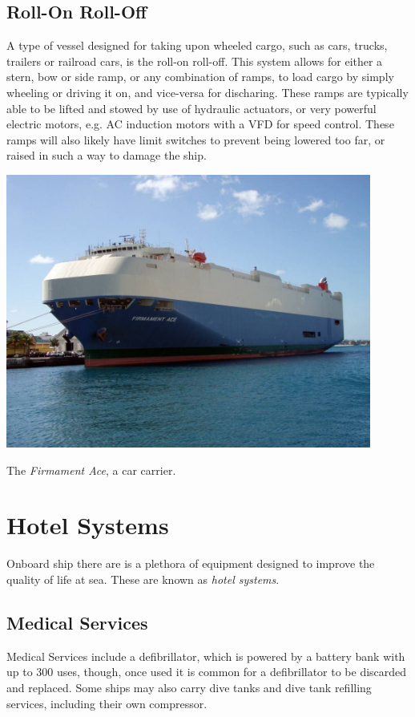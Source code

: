 \documentclass[11pt,a4paper]{article}
\begin{document}
\subsection{Roll-On Roll-Off}
A type of vessel designed for taking upon wheeled cargo, such as cars, trucks, trailers or railroad cars, is the roll-on roll-off. This system allows for either a stern, bow or side ramp, or any combination of ramps, to load cargo by simply wheeling or driving it on, and vice-versa for discharing. These ramps are typically able to be lifted and stowed by use of hydraulic actuators, or very powerful electric motors, e.g. AC induction motors with a VFD for speed control. These ramps will also likely have limit switches to prevent being lowered too far, or raised in such a way to damage the ship.
\begin{center}
\includegraphics[width=12cm]{roro}\par
The \textit{Firmament Ace}, a car carrier.
\end{center}
\section{Hotel Systems}
Onboard ship there are is a plethora of equipment designed to improve the quality of life at sea. These are known as \textit{hotel systems}.
\subsection{Medical Services}
Medical Services include a defibrillator, which is powered by a battery bank with up to 300 uses, though, once used it is common for a defibrillator to be discarded and replaced. Some ships may also carry dive tanks and dive tank refilling services, including their own compressor.
\end{document}
